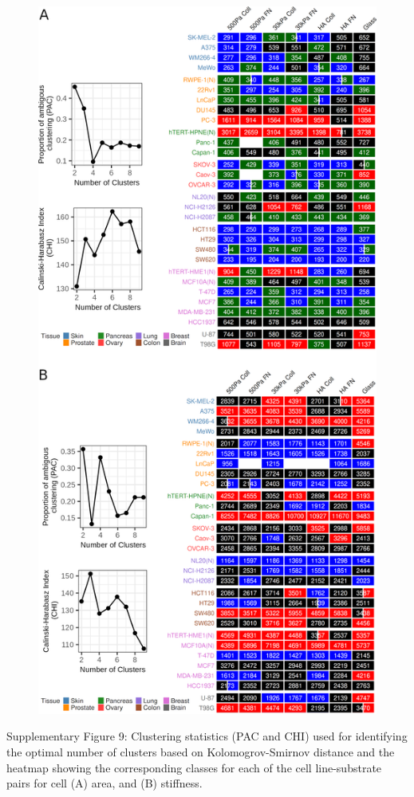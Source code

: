 \documentclass[11pt,letterpaper,english,oneside]{article} %
\begin{document}
\begin{figure}
    \centering
    \includegraphics[scale=0.95]{../Figures/Supplementary_Figure9/supplementary_figure9.png} 
    \caption{}
    \label{fig:fig9}
\end{figure}
\clearpage
\begin{adjustwidth}{1cm}{1cm}
  Supplementary Figure 9: Clustering statistics (PAC and CHI) used for identifying the optimal number of clusters based on Kolomogrov-Smirnov distance and 
  the heatmap showing the corresponding classes for each of the cell line-substrate pairs for cell (A) area, and (B) stiffness.
\end{adjustwidth}
\end{document}
